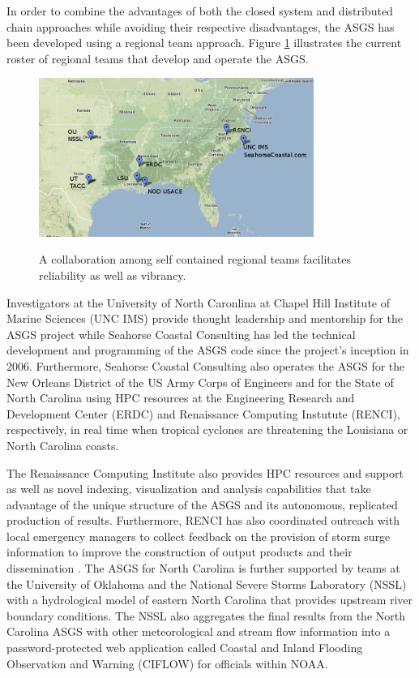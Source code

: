 \documentclass[jmse,article,submit,moreauthors,pdftex,12pt,a4paper]{mdpi}
\begin{document}
In order to combine the advantages of both the closed system and 
distributed chain approaches while avoiding their respective 
disadvantages, the ASGS has been developed using a regional team 
approach. Figure \ref{fig:regional_teams} illustrates the current 
roster of regional teams that develop and operate the ASGS. 

\begin{figure}[t]
  \centering
  \includegraphics[width=0.8\textwidth]{regional_teams}\\
  \caption{A collaboration among self contained regional teams facilitates reliability as well as vibrancy.}
  \label{fig:regional_teams}
\end{figure}

Investigators at the University of North Caronlina at Chapel Hill 
Institute of Marine Sciences (UNC IMS) provide thought leadership 
and mentorship for the ASGS project while Seahorse Coastal 
Consulting has led the technical development and programming of the 
ASGS code since the project's inception in 2006. Furthermore, 
Seahorse Coastal Consulting also operates the ASGS for the New 
Orleans District of the US Army Corps of Engineers and for the State 
of North Carolina using HPC resources at the Engineering Research 
and Development Center (ERDC) and Renaissance Computing Instutute 
(RENCI), respectively, in real time when tropical cyclones are 
threatening the Louisiana or North Carolina coasts. 

The Renaissance Computing Institute also provides HPC resources and 
support as well as novel indexing, visualization and analysis 
capabilities \cite {BlantonBO2012} that take advantage of the unique 
structure of the ASGS and its autonomous, replicated production of 
results. Furthermore, RENCI has also coordinated outreach with local 
emergency managers to collect feedback on the provision of storm 
surge information to improve the construction of output products and 
their dissemination \cite{LosegoJL2012}. The ASGS for North Carolina 
is further supported by teams at the University of Oklahoma and the 
National Severe Storms Laboratory (NSSL) with a hydrological model 
of eastern North Carolina that provides upstream river boundary 
conditions. The NSSL also aggregates the final results from the 
North Carolina ASGS with other meteorological and stream flow 
information into a password-protected web application called Coastal 
and Inland Flooding Observation and Warning (CIFLOW) \cite 
{VanCootenS2011} for officials within NOAA. 
\end{document}
